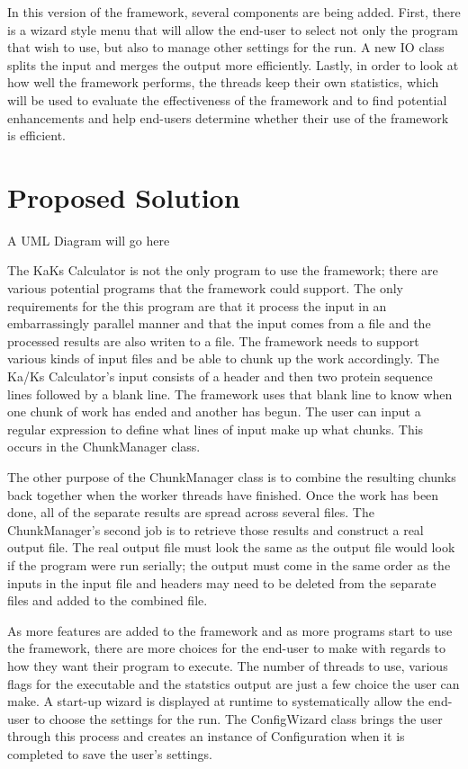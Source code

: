 \documentclass[12pt]{article}
\begin{document}

In this version of the framework, several components are being added. First, 
there is a wizard style menu that will allow the end-user to select not only the 
program that wish to use, but also to manage other settings for the run. A new 
IO class splits the input and merges the output more efficiently. Lastly, in 
order to look at how well the framework performs, the threads keep their own 
statistics, which will be used to evaluate the effectiveness of the framework 
and to find potential enhancements and help end-users determine whether their 
use of the framework is efficient.

\section{Proposed Solution}

A UML Diagram will go here

The KaKs Calculator is not the only program to use the framework; there are
various potential programs that the framework could support. The only 
requirements for the this program are that it process the input in an 
embarrassingly parallel manner and that the input comes from a file and the 
processed results are also writen to a file. The framework needs to support 
various kinds of input files and be able to chunk up the work accordingly. The 
Ka/Ks Calculator's input consists of a header and then two protein sequence 
lines followed by a blank line. The framework uses that blank line to know when 
one chunk of work has ended and another has begun. The user can input a regular 
expression to define what lines of input make up what chunks. This occurs in 
the ChunkManager class. 

The other purpose of the ChunkManager class is to combine the resulting chunks 
back together when the worker threads have finished. Once the work has been
done, all of the separate results are spread across several files. The
ChunkManager's second job is to retrieve those results and construct a real
output file. The real output file must look the same as the output file would
look if the program were run serially; the output must come in the same order as
the inputs in the input file and headers may need to be deleted from the
separate files and added to the combined file.

As more features are added to the framework and as more programs start to use 
the framework, there are more choices for the end-user to make with regards to 
how they want their program to execute. The number of threads to use, various 
flags for the executable and the statstics output are just a few choice the 
user can make. A start-up wizard is displayed at runtime to systematically allow
the end-user to choose the settings for the run. The ConfigWizard class brings 
the user through this process and creates an instance of Configuration when it 
is completed to save the user's settings.
\end{document}
